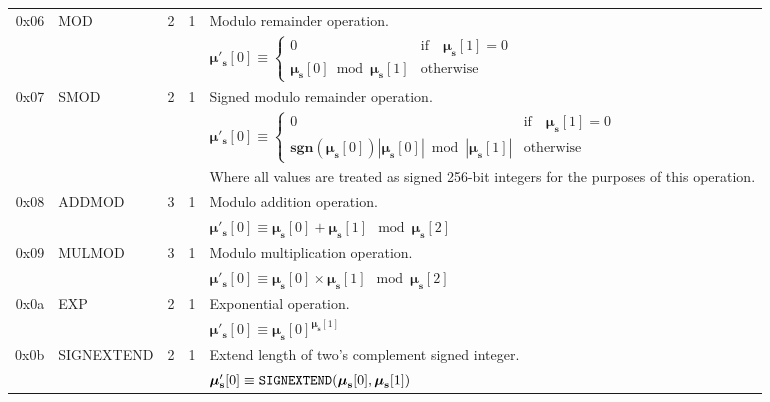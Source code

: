 \documentclass[9pt,oneside]{amsart}
\begin{document}
\begin{tabular*}{\columnwidth}[h]{rlrrl}
\midrule
0x06 & {\small MOD} & 2 & 1 & Modulo remainder operation. \\
&&&& $\boldsymbol{\mu}'_\mathbf{s}[0] \equiv \begin{cases}0 & \text{if} \quad \boldsymbol{\mu}_\mathbf{s}[1] = 0\\ \boldsymbol{\mu}_\mathbf{s}[0] \bmod \boldsymbol{\mu}_\mathbf{s}[1] & \text{otherwise}\end{cases}$  \\
\midrule
0x07 & {\small SMOD} & 2 & 1 & Signed modulo remainder operation. \\
&&&& $\boldsymbol{\mu}'_\mathbf{s}[0] \equiv \begin{cases}0 & \text{if} \quad \boldsymbol{\mu}_\mathbf{s}[1] = 0\\ \mathbf{sgn} (\boldsymbol{\mu}_\mathbf{s}[0]) |\boldsymbol{\mu}_\mathbf{s}[0]| \bmod |\boldsymbol{\mu}_\mathbf{s}[1]| & \text{otherwise}\end{cases}$  \\
&&&& Where all values are treated as signed 256-bit integers for the purposes of this operation. \\
\midrule
0x08 & {\small ADDMOD} & 3 & 1 & Modulo addition operation. \\
&&&& $\boldsymbol{\mu}'_\mathbf{s}[0] \equiv \boldsymbol{\mu}_\mathbf{s}[0] + \boldsymbol{\mu}_\mathbf{s}[1] \mod \boldsymbol{\mu}_\mathbf{s}[2]$ \\
\midrule
0x09 & {\small MULMOD} & 3 & 1 & Modulo multiplication operation. \\
&&&& $\boldsymbol{\mu}'_\mathbf{s}[0] \equiv \boldsymbol{\mu}_\mathbf{s}[0] \times \boldsymbol{\mu}_\mathbf{s}[1] \mod \boldsymbol{\mu}_\mathbf{s}[2]$ \\
\midrule
0x0a & {\small EXP} & 2 & 1 & Exponential operation. \\
&&&& $\boldsymbol{\mu}'_\mathbf{s}[0] \equiv \boldsymbol{\mu}_\mathbf{s}[0] ^ {\boldsymbol{\mu}_\mathbf{s}[1] }$ \\
\midrule
0x0b & {\small SIGNEXTEND} & 2 & 1 & Extend length of two's complement signed integer. \\
&&&& $\boldsymbol{\mu}'_\mathbf{s}[0] \equiv \mathtt{\tiny SIGNEXTEND}(\boldsymbol{\mu}_\mathbf{s}[0], \boldsymbol{\mu}_\mathbf{s}[1]) $ \\
\end{tabular*}
\end{document}
